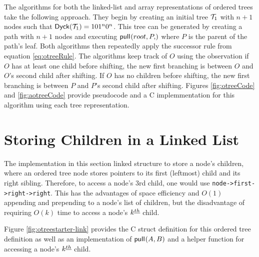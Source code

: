 





The algorithms for both the linked-list and array representations of ordered trees take the following approach.  They begin by creating an initial tree $\mathcal{T}_1$ with $n+1$ nodes such that $\mathsf{Dyck}{(\mathcal{T}_1)}=101^{n}0^{n}$.  This tree can be generated by creating a path with $n+1$ nodes and executing $\pull{root,P}$ where $P$ is the parent of the path's leaf. Both algorithms then repeatedly apply the successor rule from equation \ref{eq:otreeRule}.  The algorithms keep track of $O$ using the observation if $O$ has at least one child before shifting, the new first branching is between $O$ and $O$'s second child after shifting.  If $O$ has no children before shifting, the new first branching is between $P$ and $P$'s second child after shifting. Figures \ref{fig:otreeCode} and \ref{fig:aotreeCode} provide pseudocode and a C implemmentation for this algorithm using each tree representation. 


\section{Storing Children in a Linked List}\label{sec:otree-link}
The implementation in this section linked structure to store a node's children, where an ordered tree node stores pointers to its first (leftmost) child and its right sibling.  Therefore, to access a node's 3rd child, one would use \verb+node->first->right->right+.
This has the advantages of space efficiency and $O(1)$ appending and prepending to a node's list of children, but the disadvantage of requiring $O(k)$ time to access a node's $k^{\underline{th}}$ child. 

Figure \ref{fig:otreestarter-link} provides the C struct definition for this ordered tree definition as well as an implementation of $\mathsf{pull}_{}(A,B)$ and a helper function for accessing a node's $k^{\underline{th}}$ child. 

